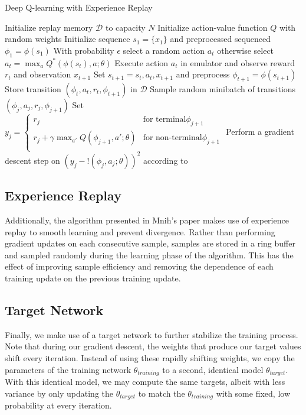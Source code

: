 \documentclass{article}
\begin{document}
\begin{algorithm}
\caption{Deep Q-learning with Experience Replay}
\label{alg:dqn}
\begin{algorithmic}[1]
\State Initialize replay memory $\mathcal{D}$ to capacity $N$
\State Initialize action-value function $Q$ with random weights
    \State Initialize sequence $s_1 = \{x_1\}$ and preprocessed sequenced $\phi_1 = \phi(s_1)$
        \State With probability $\epsilon$ select a random action $a_t$
        \State otherwise select $a_t = \max_{a}Q^{*}(\phi(s_t), a; \theta)$
        \State Execute action $a_t$ in emulator and observe reward $r_t$ and observation $x_{t + 1}$
        \State Set $s_{t + 1} = s_t, a_t, x_{t + 1}$ and preprocess $\phi_{t + 1} = \phi(s_{t + 1})$
        \State Store transition $(\phi_t, a_t, r_t, \phi_{t + 1})$ in $\mathcal{D}$
        \State Sample random minibatch of transitions $(\phi_j, a_j, r_j, \phi_{j + 1})$
        \State Set $ \displaystyle  y_j = 
                        \begin{cases}
                            r_j & \textrm{for terminal} \phi_{j + 1} \\
                            r_j + \gamma\max_{a'}Q(\phi_{j + 1}, a'; \theta) & \textrm{for non-terminal} \phi_{j + 1} \\
                        \end{cases}
                   $
        \State Perform a gradient descent step on $(y_j - !(\phi_j, a_j; \theta))^2$ according to 
    \EndFor
\EndFor
\end{algorithmic}
\end{algorithm}

\subsection{Experience Replay}
Additionally, the algorithm presented in Mnih's paper makes use of experience replay to smooth learning and prevent divergence.
Rather than performing gradient updates on each consecutive sample, samples are stored in a ring buffer and sampled randomly during the learning phase of the algorithm. 
This has the effect of improving sample efficiency and removing the dependence of each training update on the previous training update.

\subsection{Target Network}
Finally, we make use of a target network to further stabilize the training process. 
Note that during our gradient descent, the weights that produce our target values shift every iteration.
Instead of using these rapidly shifting weights, we copy the parameters of the training network $\theta_{training}$ to a second, identical model $\theta_{target}$.
With this identical model, we may compute the same targets, albeit with less variance by only updating the $\theta_{target}$ to match the $\theta_{training}$ with some fixed, low probability at every iteration.
\end{document}
